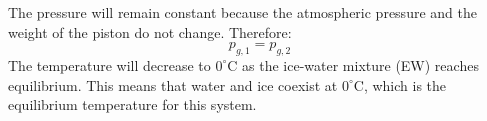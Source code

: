 The pressure will remain constant because the atmospheric pressure and the weight of the piston do not change. Therefore:  
\[
p_{g,1} = p_{g,2}
\]  
The temperature will decrease to \( 0^\circ\text{C} \) as the ice-water mixture (EW) reaches equilibrium. This means that water and ice coexist at \( 0^\circ\text{C} \), which is the equilibrium temperature for this system.
